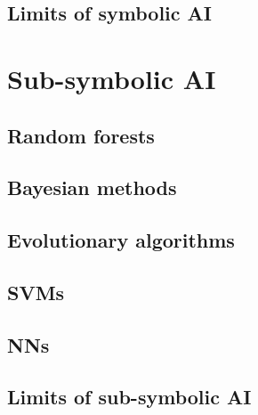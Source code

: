 \subsection{Limits of symbolic \ac{AI}}\label{subsec:limits-of-symbolic-ai}

\section{Sub-symbolic \ac{AI}}\label{sec:sub-symbolic-ai}

\subsection{Random forests}\label{subsec:random-forests}

\subsection{Bayesian methods}\label{subsec:bayesian-methods}

\subsection{Evolutionary algorithms}\label{subsec:evolutionary-algorithms}

\subsection{\Aclp{SVM}}\label{subsec:svm}

\subsection{\Aclp{NN}}\label{subsec:neural-networks}

\subsection{Limits of sub-symbolic \ac{AI}}\label{subsec:limits-of-sub-symbolic-ai}
